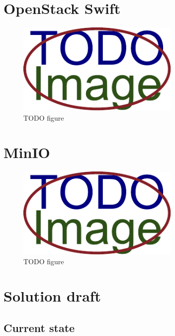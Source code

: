 \chapter{OpenStack Swift}
    \textcolor{gray}{\Blindtext}
    \begin{figure}[hbt]
        \centering
        \includegraphics[width=0.7\textwidth]{obrazky-figures/placeholder.pdf}
        \caption{TODO figure}
    \end{figure}
\chapter{MinIO}
    \textcolor{gray}{\Blindtext}
    \begin{figure}[hbt]
        \centering
        \includegraphics[width=0.7\textwidth]{obrazky-figures/placeholder.pdf}
        \caption{TODO figure}
    \end{figure}

\chapter{Solution draft}
    \textcolor{gray}{\Blindtext}
\section{Current state}
    \textcolor{gray}{\Blindtext}
